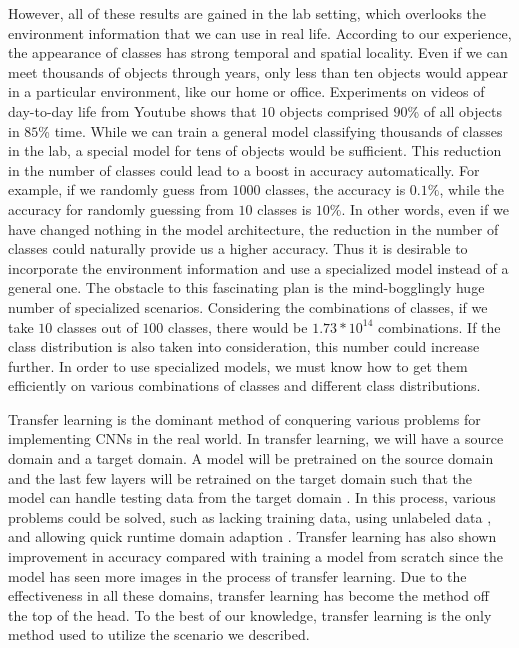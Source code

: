 \documentclass{article}
\begin{document}
However, all of these results are gained in the lab setting, which overlooks the environment information that we can use in real life. According to our experience, the appearance of classes has strong temporal and spatial locality. Even if we can meet thousands of objects through years, only less than ten objects would appear in a particular environment, like our home or office. Experiments on videos of day-to-day life from Youtube \cite{shen2017fast} shows that $10$ objects comprised $90$\% of all objects in $85$\% time. While we can train a general model classifying thousands of classes in the lab, a special model for tens of objects would be sufficient. This reduction in the number of classes could lead to a boost in accuracy automatically. For example, if we randomly guess from $1000$ classes, the accuracy is $0.1\%$, while the accuracy for randomly guessing from $10$ classes is $10\%$. In other words, even if we have changed nothing in the model architecture, the reduction in the number of classes could naturally provide us a higher accuracy. Thus it is desirable to incorporate the environment information and use a specialized model instead of a general one. The obstacle to this fascinating plan is the mind-bogglingly huge number of specialized scenarios. Considering the combinations of classes, if we take $10$ classes out of $100$ classes, there would be $1.73*10^{14}$ combinations. If the class distribution is also taken into consideration, this number could increase further. In order to use specialized models, we must know how to get them efficiently on various combinations of classes and different class distributions. 

Transfer learning is the dominant method of conquering various problems for implementing CNNs in the real world. In transfer learning, we will have a source domain and a target domain. A model will be pretrained on the source domain and the last few layers will be retrained on the target domain such that the model can handle testing data from the target domain \cite{doersch2015unsupervised, han2016mcdnn, oquab2014learning, shen2017fast, yosinski2014transferable}. In this process, various problems could be solved, such as lacking training data, using unlabeled data \cite{doersch2015unsupervised, noroozi2016unsupervised}, and allowing quick runtime domain adaption \cite{han2016mcdnn, shen2017fast}. Transfer learning has also shown improvement in accuracy compared with training a model from scratch \cite{oquab2014learning, yosinski2014transferable} since the model has seen more images in the process of transfer learning. Due to the effectiveness in all these domains, transfer learning has become the method off the top of the head. To the best of our knowledge, transfer learning is the only method used to utilize the scenario we described.
\end{document}
